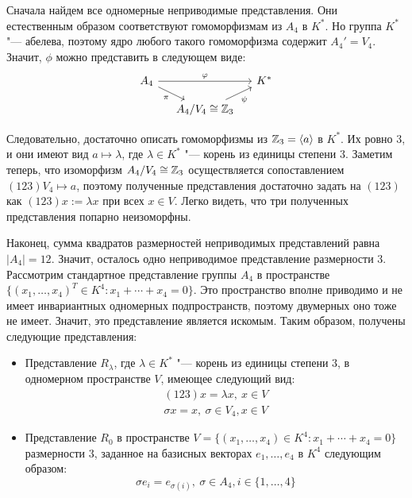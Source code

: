 \begin{solution}
	Сначала найдем все одномерные неприводимые представления. Они естественным образом соответствуют гомоморфизмам из $A_4$ в $K^*$. Но группа $K^*$ "--- абелева, поэтому ядро любого такого гомоморфизма содержит $A_4' = V_4$. Значит, $\phi$ можно представить в следующем виде:
	\[
	\begin{tikzcd}[row sep = small, column sep = small]
		A_4 \arrow[swap]{dr}{\pi} \arrow[]{rr}{\phi} && K^*\\
		& A_4 / V_4 \cong \Z_3 \arrow[swap]{ur}{\psi}&
	\end{tikzcd}
	\]
	
	Следовательно, достаточно описать гомоморфизмы из $\mathbb{Z}_3 = \langle a \rangle$ в $K^*$. Их ровно $3$, и они имеют вид $a \mapsto \lambda$, где $\lambda \in K^*$ "--- корень из единицы степени $3$. Заметим теперь, что изоморфизм $A_4 / V_4 \cong \mathbb{Z}_3$ осуществляется сопоставлением $(123)V_4 \mapsto a$, поэтому полученные представления достаточно задать на $(123)$ как $(123)x := \lambda x$ при всех $x \in V$. Легко видеть, что три полученных представления попарно неизоморфны.
	
	Наконец, сумма квадратов размерностей неприводимых представлений равна $|A_4| = 12$. Значит, осталось одно неприводимое представление размерности $3$. Рассмотрим стандартное представление группы $A_4$ в пространстве $\{(x_1, \dotsc, x_4)^T \in K^4 : x_1 + \dotsb + x_4 = 0\}$. Это пространство вполне приводимо и не имеет инвариантных одномерных подпространств, поэтому двумерных оно тоже не имеет. Значит, это представление является искомым. Таким образом, получены следующие представления:
	\begin{itemize}
		\item Представление $R_\lambda$, где $\lambda \in K^*$ "--- корень из единицы степени $3$, в одномерном пространстве $V$, имеющее следующий вид:
		\begin{gather*}
			(123) x = \lambda x,~x \in V\\
			\sigma x = x,~\sigma \in V_4, x \in V
		\end{gather*}
		
		\item Представление $R_0$ в пространстве $V = \{(x_1, \dotsc, x_4) \in K^4 : x_1 + \dotsb + x_4 = 0\}$ размерности $3$, заданное на базисных векторах $e_1, \dotsc, e_4$ в $K^4$ следующим образом:
		\[\sigma e_i = e_{\sigma(i)},~\sigma \in A_4, i \in \{1, \dotsc, 4\}\]
	\end{itemize}
	

\end{solution}
